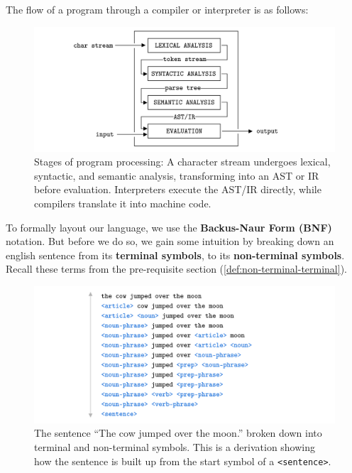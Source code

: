 \noindent
The flow of a program through a compiler or interpreter is as follows:
\begin{figure}[h]
    \centering
    \includegraphics[width=1\textwidth]{Sections/Formal/comp2.png}
    \caption{Stages of program processing: A character stream undergoes lexical, syntactic, and semantic analysis, transforming into an AST or IR before evaluation. Interpreters execute the AST/IR directly, while compilers translate it into machine code.}
\end{figure}

\newpage
    
\noindent
\noindent
To formally layout our language, we use the \textbf{Backus-Naur Form (BNF)} notation. But before we 
do so, we gain some intuition by breaking down an english sentence from its \textbf{terminal symbols}, to its \textbf{non-terminal symbols}. Recall these terms from the pre-requisite section (\ref{def:non-terminal-terminal}).\\

\begin{figure}[h]
    \centering
    \includegraphics[width=1\textwidth]{Sections/Formal/derivation.png}
    \caption{The sentence ``The cow jumped over the moon.'' broken down into terminal and non-terminal symbols. This is a derivation showing how the sentence is built up from the start symbol of a \texttt{<sentence>}.}
\end{figure}

